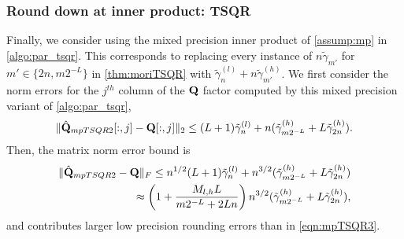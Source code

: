\subsubsection{Round down at inner product: TSQR}
Finally, we consider using the mixed precision inner product of \cref{assump:mp} in \cref{algo:par_tsqr}.
This corresponds to replacing every instance of $n\tilde{\gamma}_{m'}$ for $m'\in\{2n, m2^{-L}\}$ in \cref{thm:moriTSQR} with $\tilde{\gamma}_n^{(l)} + n\tilde{\gamma}_{m'}^{(h)}$.
We first consider the norm errors for the $j^{th}$ column of the $\mathbf{Q}$ factor computed by this mixed precision variant of \cref{algo:par_tsqr},
\begin{equation}
	\|\hat{\bb{Q}}_{mpTSQR2}[:,j] -\bb{Q}[:,j]\|_2 \leq (L+1)\tilde{\gamma}_n^{(l)} +n(\tilde{\gamma}_{m2^{-L}}^{(h)} + L\tilde{\gamma}_{ 2n}^{(h)}).\label{eqn:mptsqr2Qcol}
\end{equation} 
Then, the matrix norm error bound is 
\begin{align}
\|\hat{\bb{Q}}_{mpTSQR2}-\bb{Q}\|_F \leq n^{1/2}(L+1)\tilde{\gamma}_n^{(l)} +n^{3/2}(\tilde{\gamma}_{m2^{-L}}^{(h)} + L\tilde{\gamma}_{ 2n}^{(h)})\\
\approx \left(1+ \frac{M_{l,h}L}{m2^{-L}+ 2Ln}\right)n^{3/2}(\tilde{\gamma}_{m2^{-L}}^{(h)} + L\tilde{\gamma}_{ 2n}^{(h)}),\label{eqn:mptsqr2Q}
\end{align}
and contributes larger low precision rounding errors than in \cref{eqn:mpTSQR3}.